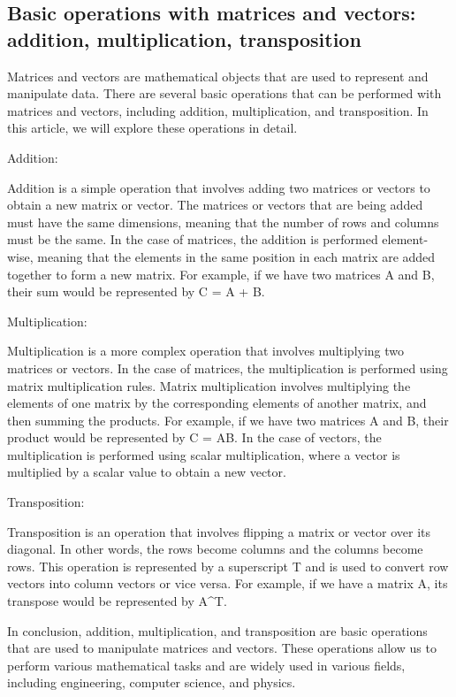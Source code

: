 \documentclass[12pt, a4paper, oneside]{article}
\begin{document}
\subsection{ Basic operations with matrices and vectors: addition, multiplication, transposition }
Matrices and vectors are mathematical objects that are used to represent and manipulate data. There are several basic operations that can be performed with matrices and vectors, including addition, multiplication, and transposition. In this article, we will explore these operations in detail.

Addition:

Addition is a simple operation that involves adding two matrices or vectors to obtain a new matrix or vector. The matrices or vectors that are being added must have the same dimensions, meaning that the number of rows and columns must be the same. In the case of matrices, the addition is performed element-wise, meaning that the elements in the same position in each matrix are added together to form a new matrix. For example, if we have two matrices A and B, their sum would be represented by C = A + B.

Multiplication:

Multiplication is a more complex operation that involves multiplying two matrices or vectors. In the case of matrices, the multiplication is performed using matrix multiplication rules. Matrix multiplication involves multiplying the elements of one matrix by the corresponding elements of another matrix, and then summing the products. For example, if we have two matrices A and B, their product would be represented by C = AB. In the case of vectors, the multiplication is performed using scalar multiplication, where a vector is multiplied by a scalar value to obtain a new vector.

Transposition:

Transposition is an operation that involves flipping a matrix or vector over its diagonal. In other words, the rows become columns and the columns become rows. This operation is represented by a superscript T and is used to convert row vectors into column vectors or vice versa. For example, if we have a matrix A, its transpose would be represented by A^T.

In conclusion, addition, multiplication, and transposition are basic operations that are used to manipulate matrices and vectors. These operations allow us to perform various mathematical tasks and are widely used in various fields, including engineering, computer science, and physics.
\end{document}
